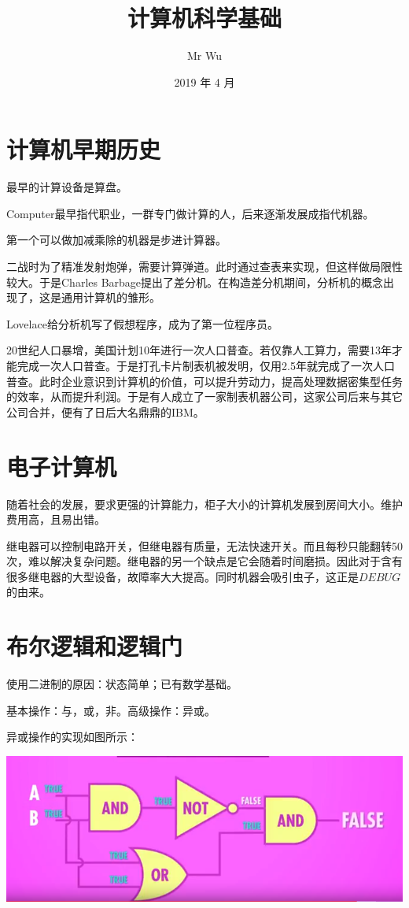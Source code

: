 \documentclass{ctexart}
\title{计算机科学基础}
\author{Mr Wu}
\date{2019 年 4 月}
\begin{document}
	\maketitle
	\section{计算机早期历史}
	最早的计算设备是算盘。
	
	Computer最早指代职业，一群专门做计算的人，后来逐渐发展成指代机器。
	
	第一个可以做加减乘除的机器是步进计算器。
	
	二战时为了精准发射炮弹，需要计算弹道。此时通过查表来实现，但这样做局限性较大。于是Charles Barbage提出了差分机。在构造差分机期间，分析机的概念出现了，这是通用计算机的雏形。
	
	Lovelace给分析机写了假想程序，成为了第一位程序员。
	
	20世纪人口暴增，美国计划10年进行一次人口普查。若仅靠人工算力，需要13年才能完成一次人口普查。于是打孔卡片制表机被发明，仅用2.5年就完成了一次人口普查。此时企业意识到计算机的价值，可以提升劳动力，提高处理数据密集型任务的效率，从而提升利润。于是有人成立了一家制表机器公司，这家公司后来与其它公司合并，便有了日后大名鼎鼎的IBM。
	\section{电子计算机}
	随着社会的发展，要求更强的计算能力，柜子大小的计算机发展到房间大小。维护费用高，且易出错。
	
	继电器可以控制电路开关，但继电器有质量，无法快速开关。而且每秒只能翻转50次，难以解决复杂问题。继电器的另一个缺点是它会随着时间磨损。因此对于含有很多继电器的大型设备，故障率大大提高。同时机器会吸引虫子，这正是$ DEBUG $的由来。
	\section{布尔逻辑和逻辑门}
	使用二进制的原因：状态简单；已有数学基础。
	
	基本操作：与，或，非。高级操作：异或。
	
	异或操作的实现如图所示：
	
	\includegraphics[scale=0.5]{NOR}
\end{document}
